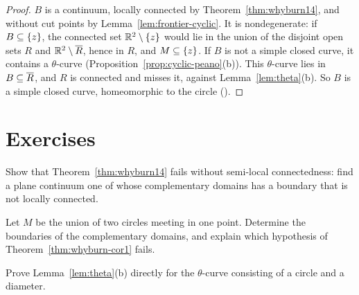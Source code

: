 \begin{proof}
$B$ is a continuum, locally connected by Theorem~\ref{thm:whyburn14}, and without cut points by Lemma~\ref{lem:frontier-cyclic}. It is nondegenerate: if $B\subseteq\left\{ z \right\}$, the connected set $\mathbb{R}^2\setminus\left\{ z \right\}$ would lie in the union of the disjoint open sets $R$ and
$\mathbb{R}^2\setminus\overline{R}$, hence in $R$, and $M\subseteq\left\{ z \right\}$. If $B$ is not a simple closed curve, it contains a $\theta$-curve (Proposition~\ref{prop:cyclic-peano}(b)). This $\theta$-curve lies in $B\subseteq\overline{R}$, and $R$ is connected and misses it, against
Lemma~\ref{lem:theta}(b). So $B$ is a simple closed curve, homeomorphic to the circle ().
\end{proof}


\section*{Exercises}

\begin{exercise}
Show that Theorem~\ref{thm:whyburn14} fails without semi-local connectedness: find a plane continuum one of whose complementary domains has a boundary that is not locally connected.
\end{exercise}

\begin{exercise}
Let $M$ be the union of two circles meeting in one point. Determine the boundaries of the complementary domains, and explain which hypothesis of Theorem~\ref{thm:whyburn-cor1} fails.
\end{exercise}

\begin{exercise}
Prove Lemma~\ref{lem:theta}(b) directly for the $\theta$-curve consisting of a circle and a diameter.
\end{exercise}
